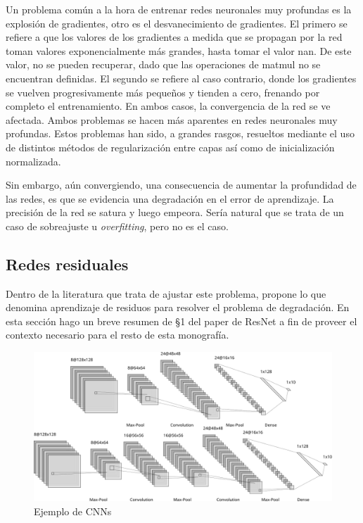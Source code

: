 \documentclass[titlepage,a4paper,oneside]{article}
\begin{document}
Un problema común a la hora de entrenar redes neuronales muy profundas es la explosión de gradientes, otro es el desvanecimiento de gradientes. El primero se refiere a que los valores de los gradientes a medida que se propagan por la red toman valores exponencialmente más grandes, hasta tomar el valor nan. De este valor, no se pueden recuperar, dado que las operaciones de matmul no se encuentran definidas. El segundo se refiere al caso contrario, donde los gradientes se vuelven progresivamente más pequeños y tienden a cero, frenando por completo el entrenamiento. En ambos casos, la convergencia de la red se ve afectada. Ambos problemas se hacen más aparentes en redes neuronales muy profundas. Estos problemas han sido, a grandes rasgos, resueltos mediante el uso de distintos métodos de regularización entre capas así como de inicialización normalizada.

Sin embargo, aún convergiendo, una consecuencia de aumentar la profundidad de las redes, es que se evidencia una degradación en el error de aprendizaje. La precisión de la red se satura y luego empeora. Sería natural que se trata de un caso de sobreajuste u \textit{overfitting}, pero no es el caso.


\subsection{Redes residuales}
Dentro de la literatura que trata de ajustar este problema, \cite{DBLP:journals/corr/HeZRS15} propone lo que denomina aprendizaje de residuos para resolver el problema de degradación. En esta sección hago un breve resumen de \S 1 del paper de ResNet a fin de proveer el contexto necesario para el resto de esta monografía.

\begin{figure}[H]
\centering
\includegraphics[width=\textwidth]{images/ex_cnns.png}
\caption{Ejemplo de CNNs}
\label{ex_cnn}
\end{figure}
\end{document}
